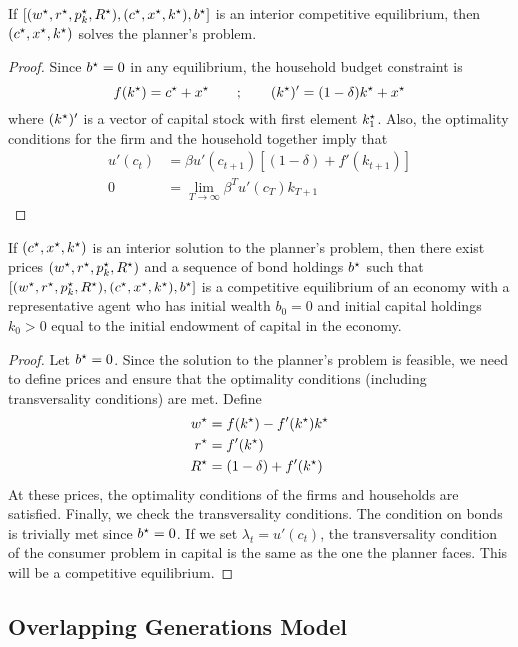 \documentclass[10pt]{article}
\begin{document}
\begin{theorem}
	 If $[(w^\star,r^\star,p_k^\star,R^\star),(c^\star,x^\star,k^\star),b^\star]$ is an interior competitive equilibrium, then $(c^\star,x^\star,k^\star)$ solves the planner's problem.
\end{theorem}
\begin{proof}
	Since $b^\star = 0$ in any equilibrium, the household budget constraint is \[f(k^\star) = c^\star + x^\star \qquad ;\qquad (k^\star)' = (1-\delta)k^\star+x^\star\]where $(k^\star)'$ is a vector of capital stock with first element $k^\star_1$. Also, the optimality conditions for the firm and the household together imply that 
	\begin{align*}
		u'(c_t) &= \beta u'(c_{t+1})[(1-\delta) + f'(k_{t+1})] \\
		0 &= \lim_{T\to\infty} \beta^T u'(c_T)k_{T+1}
	\end{align*}
\end{proof}

\begin{theorem}
	 If $(c^\star,x^\star,k^\star)$ is an interior solution to the planner's problem, then there exist prices $(w^\star,r^\star,p_k^\star,R^\star)$ and a sequence of bond holdings $b^\star$ such that $[(w^\star,r^\star,p_k^\star,R^\star),(c^\star,x^\star,k^\star),b^\star]$ is a competitive equilibrium of an economy with a representative agent who has initial wealth $b_0=0$ and initial capital holdings $k_0 > 0$ equal to the initial endowment of capital in the economy.
\end{theorem}
\begin{proof}
	Let $b^\star = 0$. Since the solution to the planner's problem is feasible, we need to define prices and ensure that the optimality conditions (including transversality conditions) are met. Define \begin{align*} w^\star &= f(k^\star) - f'(k^\star)k^\star \\ r^\star &= f'(k^\star) \\ R^\star &= (1-\delta) + f'(k^\star)\end{align*}At these prices, the optimality conditions of the firms and households are satisfied. Finally, we check the transversality conditions. The condition on bonds is trivially met since $b^\star = 0$. If we set $\lambda_t = u'(c_t)$, the transversality condition of the consumer problem in capital is the same as the one the planner faces. This will be a competitive equilibrium.
\end{proof}


\subsection{Overlapping Generations Model}
\end{document}
